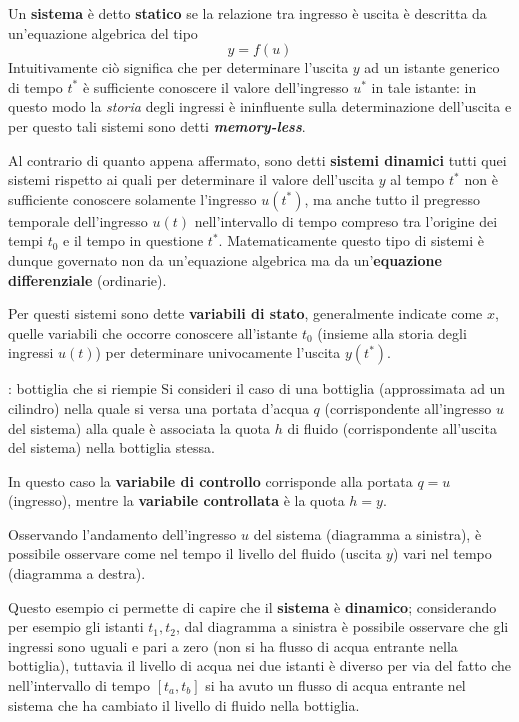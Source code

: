     	\begin{concetto}
    		Un \textbf{sistema} è detto \textbf{statico} se la relazione tra ingresso è uscita è descritta da un'equazione algebrica del tipo $$y=f(u)$$
    		Intuitivamente ciò significa che per determinare l'uscita $y$ ad un istante generico di tempo $t^*$ è sufficiente conoscere il valore dell'ingresso $u^*$ in tale istante: in questo modo la \textit{storia} degli ingressi è ininfluente sulla determinazione dell'uscita e per questo tali sistemi sono detti \textbf{\textit{memory-less}}.
    	\end{concetto}
    	\begin{concetto}
    		Al contrario di quanto appena affermato, sono detti \textbf{sistemi dinamici} tutti quei sistemi rispetto ai quali per determinare il valore dell'uscita $y$ al tempo $t^*$ non è sufficiente conoscere solamente l'ingresso $u(t^*)$, ma anche tutto il pregresso temporale dell'ingresso $u(t)$ nell'intervallo di tempo compreso tra l'origine dei tempi $t_0$ e il tempo in questione $t^*$. Matematicamente questo tipo di sistemi è dunque governato non da un'equazione algebrica ma da un'\textbf{equazione differenziale} (ordinarie).
    		
    		Per questi sistemi sono dette \textbf{variabili di stato}, generalmente indicate come $x$, quelle variabili che occorre conoscere all'istante $t_0$ (insieme alla storia degli ingressi $u(t)$) per determinare univocamente l'uscita $y(t^*)$.
    	\end{concetto}
    
    	\begin{esempio}{: bottiglia che si riempie} \label{es:intro:bottiglia}
    		Si consideri il caso di una bottiglia (approssimata ad un cilindro) nella quale si versa una portata d'acqua $q$ (corrispondente all'ingresso $u$ del sistema) alla quale è associata la quota $h$ di fluido (corrispondente all'uscita del sistema) nella bottiglia stessa.
    		
    		In questo caso la \textbf{variabile di controllo} corrisponde alla portata $q=u$ (ingresso), mentre la \textbf{variabile controllata} è la quota $h = y$.
    		\begin{center}
    		\end{center}
    		Osservando l'andamento dell'ingresso $u$ del sistema (diagramma a sinistra), è possibile osservare come nel tempo il livello del fluido (uscita $y$) vari nel tempo (diagramma a destra).
    		
    		Questo esempio ci permette di capire che il \textbf{sistema} è \textbf{dinamico}; considerando per esempio gli istanti $t_1,t_2$, dal diagramma a sinistra è possibile osservare che gli ingressi sono uguali e pari a zero (non si ha flusso di acqua entrante nella bottiglia), tuttavia il livello di acqua nei due istanti è diverso per via del fatto che nell'intervallo di tempo $[t_a,t_b]$ si ha avuto un flusso di acqua entrante nel sistema che ha cambiato il livello di fluido nella bottiglia.
    	\end{esempio}
    
